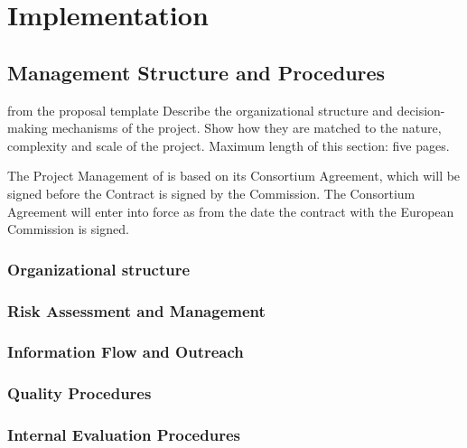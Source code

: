 \chapter{Implementation}\label{chap:implementation}

\section{Management Structure and Procedures}\label{chap:management}
\begin{todo}{from the proposal template}
  Describe the organizational structure and decision-making mechanisms
  of the project. Show how they are matched to the nature, complexity
  and scale of the project.  Maximum length of this section: five pages.
\end{todo}

The Project Management of {\pn} is based on its Consortium Agreement, which will be
signed before the Contract is signed by the Commission. The Consortium Agreement will
enter into force as from the date the contract with the European Commission is signed.
\subsection{Organizational structure}\label{sec:management-structure}
\subsection{Risk Assessment and Management}
\subsection{Information Flow and Outreach}\label{sec:spread-excellence}
\subsection{Quality Procedures}\label{sec:quality-management}
\subsection{Internal Evaluation Procedures}
\newpage
